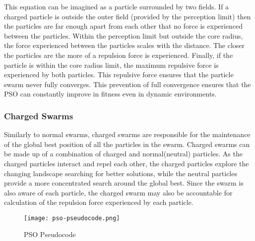 This equation can be imagined as a particle surrounded by two fields. If a charged particle is outside the outer field (provided by the perception limit) then the particles are far enough apart from each other that no force is experienced between the particles. Within the perception limit but outside the core radius, the force experienced between the particles scales with the distance. The closer the particles are the more of a repulsion force is experienced. Finally, if the particle is within the core radius limit, the maximum repulsive force is experienced by both particles. This repulsive force ensures that the particle swarm never fully converges. This prevention of full convergence ensures that the PSO can constantly improve in fitness even in dynamic environments.

\subsubsection{Charged Swarms}
Similarly to normal swarms, charged swarms are responsible for the maintenance of the global best position of all the particles in the swarm. Charged swarms can be made up of a combination of charged and normal(neutral) particles. As the charged particles interact and repel each other, the charged particles explore the changing landscape searching for better solutions, while the neutral particles provide a more concentrated search around the global best. Since the swarm is also aware of each particle, the charged swarm may also be accountable for calculation of the repulsion force experienced by each particle.
 
\begin{figure}
  \centering
  \texttt{[image: pso-pseudocode.png]}
  \caption{PSO Pseudocode\cite{pso-pseudocode-ref}}
  \label{fig:pso-pseudocode}
\end{figure}
	
	


